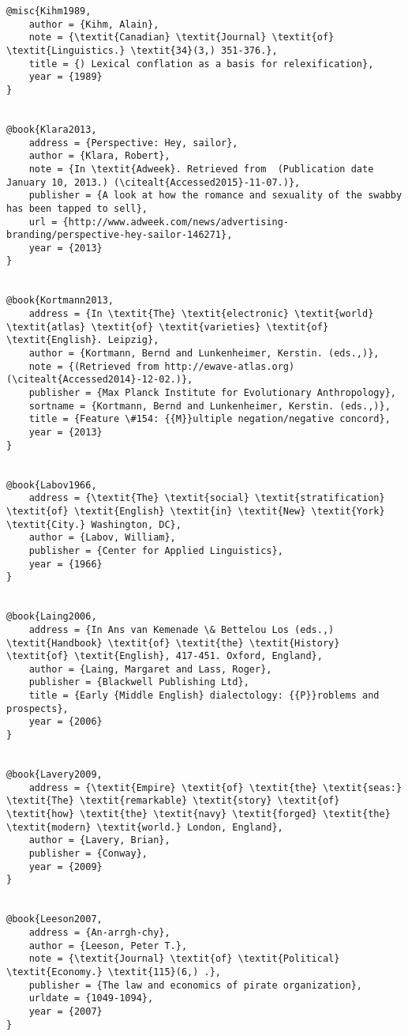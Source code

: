 \begin{verbatim}
@misc{Kihm1989,
	author = {Kihm, Alain},
	note = {\textit{Canadian} \textit{Journal} \textit{of} \textit{Linguistics.} \textit{34}(3,) 351-376.},
	title = {) Lexical conflation as a basis for relexification},
	year = {1989}
}


@book{Klara2013,
	address = {Perspective: Hey, sailor},
	author = {Klara, Robert},
	note = {In \textit{Adweek}. Retrieved from  (Publication date January 10, 2013.) (\citealt{Accessed2015}-11-07.)},
	publisher = {A look at how the romance and sexuality of the swabby has been tapped to sell},
	url = {http://www.adweek.com/news/advertising-branding/perspective-hey-sailor-146271},
	year = {2013}
}


@book{Kortmann2013,
	address = {In \textit{The} \textit{electronic} \textit{world} \textit{atlas} \textit{of} \textit{varieties} \textit{of} \textit{English}. Leipzig},
	author = {Kortmann, Bernd and Lunkenheimer, Kerstin. (eds.,)},
	note = {(Retrieved from http://ewave-atlas.org) (\citealt{Accessed2014}-12-02.)},
	publisher = {Max Planck Institute for Evolutionary Anthropology},
	sortname = {Kortmann, Bernd and Lunkenheimer, Kerstin. (eds.,)},
	title = {Feature \#154: {{M}}ultiple negation/negative concord},
	year = {2013}
}


@book{Labov1966,
	address = {\textit{The} \textit{social} \textit{stratification} \textit{of} \textit{English} \textit{in} \textit{New} \textit{York} \textit{City.} Washington, DC},
	author = {Labov, William},
	publisher = {Center for Applied Linguistics},
	year = {1966}
}


@book{Laing2006,
	address = {In Ans van Kemenade \& Bettelou Los (eds.,) \textit{Handbook} \textit{of} \textit{the} \textit{History} \textit{of} \textit{English}, 417-451. Oxford, England},
	author = {Laing, Margaret and Lass, Roger},
	publisher = {Blackwell Publishing Ltd},
	title = {Early {Middle English} dialectology: {{P}}roblems and prospects},
	year = {2006}
}


@book{Lavery2009,
	address = {\textit{Empire} \textit{of} \textit{the} \textit{seas:} \textit{The} \textit{remarkable} \textit{story} \textit{of} \textit{how} \textit{the} \textit{navy} \textit{forged} \textit{the} \textit{modern} \textit{world.} London, England},
	author = {Lavery, Brian},
	publisher = {Conway},
	year = {2009}
}


@book{Leeson2007,
	address = {An-arrgh-chy},
	author = {Leeson, Peter T.},
	note = {\textit{Journal} \textit{of} \textit{Political} \textit{Economy.} \textit{115}(6,) .},
	publisher = {The law and economics of pirate organization},
	urldate = {1049-1094},
	year = {2007}
}



\end{verbatim}
